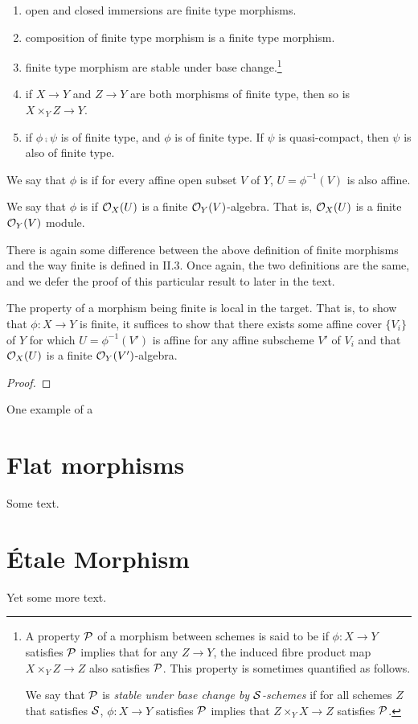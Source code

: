 \begin{cor}
\begin{enumerate}
\item open and closed immersions are finite type morphisms.

\item composition of finite type morphism is a finite type 
morphism.

\item finite type morphism are stable under base change.\footnote{
A property $\mathcal{P}$ of a morphism between schemes is said to 
be  if 
$\phi: X \to Y$ satisfies $\mathcal{P}$ implies that for any $Z 
\to Y$, the induced fibre product map $X \times_Y Z \to Z$ also 
satisfies $\mathcal{P}$. This property is sometimes quantified as 
follows.

We say that $\mathcal{P}$ is \emph{stable under base change by 
$\mathcal{S}$-schemes} if for all schemes $Z$ that satisfies 
$\mathcal{S}$, $\phi : X \to Y$ satisfies $\mathcal{P}$ implies 
that $Z \times_Y X \to Z$ satisfies $\mathcal{P}$.}

\item if $X \to Y$ and $Z \to Y$ are both morphisms of finite
type, then so is $X \times_Y Z \to Y$.

\item if $\phi \comp \psi$ is of finite type, and $\phi$ is of
finite type. If $\psi$ is quasi-compact, then $\psi$ is also
of finite type.
\end{enumerate}
\end{cor}

\begin{defn}
We say that $\phi$ is  if for every 
affine open subset $V$ of $Y$, $U = \phi^{-1}(V)$ is also affine.

We say that $\phi$ is  if 
$\mathcal{O}_X(U)$ is a finite $\mathcal{O}_Y(V)$-algebra. That is, $\mathcal{O}_X(U)$ is
a finite $\mathcal{O}_Y(V)$ module.
\end{defn}

There is again some difference between the above definition of
finite morphisms and the way finite is defined in \cite{Hart}
II.3. Once again, the two definitions are the same, and we defer
the proof of this particular result to later in the text.

\begin{prop}
The property of a morphism being finite is local in the target.
That is, to show that $\phi: X \to Y$ is finite, it suffices to
show that there exists some affine cover $\{V_i\}$ of $Y$ for 
which $U = \phi^{-1}(V')$ is affine for any affine subscheme $V'$ 
of $V_i$ and that $\mathcal{O}_X(U)$ is a finite $\mathcal{O}_Y(V')$-algebra.
\end{prop}
\begin{proof}

\end{proof}

One example of a 

\section{Flat morphisms}

Some text.

\section{\'Etale Morphism}

Yet some more text.
